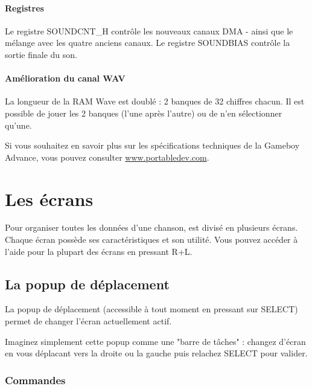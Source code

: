 \documentclass[12pt,a4paper]{article}
\begin{document}
            \paragraph{Registres} Le registre SOUNDCNT\_H contrôle les nouveaux canaux DMA - ainsi que le mélange avec les quatre anciens canaux. Le registre SOUNDBIAS contrôle la sortie finale du son.
            
            \paragraph{Amélioration du canal WAV} La longueur de la RAM Wave est doublé : 2 banques de 32 chiffres chacun. Il est possible de jouer les 2 banques (l'une après l'autre) ou de n'en sélectionner qu'une.
            
            \medskip
  Si vous souhaitez en savoir plus sur les spécifications techniques de la Gameboy Advance, vous pouvez consulter \href{http://www.portabledev.com/media/GBA/tutoriels/gbatek.htm}{www.portabledev.com}.
        
  \section{Les écrans}
  
    Pour organiser toutes les données d'une chanson, \FAT est divisé en plusieurs écrans. Chaque écran possède ses caractéristiques et son utilité. Vous pouvez accéder à l'aide pour la plupart des écrans en pressant R+L.
  
    \subsection{La popup de déplacement}
    
    La popup de déplacement (accessible à tout moment en pressant sur SELECT) permet de changer l'écran actuellement actif. 
    
    
    Imaginez simplement cette popup comme une "barre de tâches" : changez d'écran en vous déplacant vers la droite ou la gauche puis relachez SELECT pour valider.
    
        \subsubsection{Commandes}
        
\end{document}
